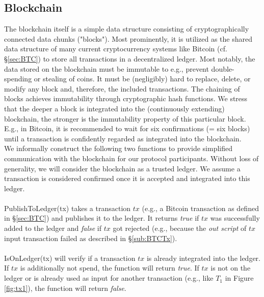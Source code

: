 \documentclass{cacthesis}
\newcounter{protocol}
\begin{document}
        
        \subsection{Blockchain}
        \label{sub:Blockchain}
        
        The blockchain itself is a simple data structure consisting of cryptographically connected data chunks ("blocks"). Most prominently, it is utilized as the shared data structure of many current cryptocurrency systems like Bitcoin (cf. §\ref{sec:BTC}) to store all transactions in a decentralized ledger. Most notably, the data stored on the blockchain must be immutable to e.g., prevent double-spending or stealing of coins. It must be (negligibly) hard to replace, delete, or modify any block and, therefore, the included transactions. The chaining of blocks achieves immutability through cryptographic hash functions. We stress that the deeper a block is integrated into the (continuously extending) blockchain, the stronger is the immutability property of this particular block. E.g., in Bitcoin, it is recommended to wait for six confirmations (= six blocks) until a transaction is confidently regarded as integrated into the blockchain. \\
        We informally construct the following two functions to provide simplified communication with the blockchain for our protocol participants. Without loss of generality, we will consider the blockchain as a trusted ledger. We assume a transaction is considered confirmed once it is accepted and integrated into this ledger. \\\\ 
        \textsf{PublishToLedger(tx)} takes a transaction $tx$ (e.g., a Bitcoin transaction as defined in §\ref{sec:BTC}) and publishes it to the ledger. It returns \textit{true} if $tx$ was successfully added to the ledger and \textit{false} if $tx$ got rejected (e.g., because the \textit{out script} of $tx$ input transaction failed as described in §\ref{sub:BTCTx}). \\\\ 
        \textsf{IsOnLedger(tx)} will verify if a transaction $tx$ is already integrated into the ledger. If $tx$ is additionally not spend, the function will return \textit{true}. If $tx$ is not on the ledger or is already used as input for another transaction (e.g., like $T_1$ in Figure \ref{fig:tx1}), the function will return \textit{false}.



        
\end{document}
